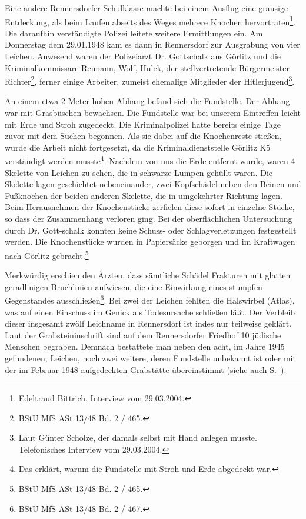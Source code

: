 Eine andere Rennersdorfer Schulklasse machte bei einem Ausflug eine grausige Entdeckung, als beim Laufen abseits des Weges mehrere Knochen hervortraten\footnote{Edeltraud Bittrich. Interview vom 29.03.2004.}. Die daraufhin verständigte Polizei leitete weitere Ermittlungen ein.
Am Donnerstag dem 29.01.1948 kam es dann in Rennersdorf zur Ausgrabung von vier Leichen. Anwesend waren der Polizeiarzt Dr. Gottschalk aus Görlitz und die Kriminalkommissare Reimann, Wolf, Hulek, der stellvertretende Bürgermeister Richter\footnote{BStU MfS ASt 13/48 Bd. 2 / 465.}, ferner einige Arbeiter, zumeist ehemalige Mitglieder der Hitlerjugend\footnote{Laut Günter Scholze, der damals selbst mit Hand anlegen musste. Telefonisches Interview vom 29.03.2004.}.
\begin{leftbar} 
An einem etwa 2 Meter hohen Abhang befand sich die Fundstelle. Der Abhang war mit Grasbüschen bewachsen. Die Fundstelle war bei unserem Eintreffen leicht mit Erde und Stroh zugedeckt. Die Kriminalpolizei hatte bereits einige Tage zuvor mit dem Suchen begonnen. Als sie dabei auf die Knochenreste stießen, wurde die Arbeit nicht fortgesetzt, da die Kriminaldienststelle Görlitz K5 verständigt werden musste\footnote{Das erklärt, warum die Fundstelle mit Stroh und Erde abgedeckt war.}.
\newline
Nachdem von uns die Erde entfernt wurde, waren 4 Skelette von Leichen zu sehen, die in schwarze Lumpen gehüllt waren. Die Skelette lagen geschichtet nebeneinander, zwei Kopfschädel neben den Beinen und Fußknochen der beiden anderen Skelette, die in umgekehrter Richtung lagen. Beim Herausnehmen der Knochenstücke zerfielen diese sofort in einzelne Stücke, so dass der Zusammenhang verloren ging. Bei der oberflächlichen Untersuchung durch Dr. Gott-schalk konnten keine Schuss- oder Schlagverletzungen festgestellt werden. Die Knochenstücke wurden in Papiersäcke geborgen und im Kraftwagen nach Görlitz gebracht.\footnote{BStU MfS ASt 13/48 Bd. 2 / 465.}
\end{leftbar}
Merkwürdig erschien den Ärzten, dass sämtliche Schädel Frakturen mit glatten geradlinigen Bruchlinien aufwiesen, die eine Einwirkung eines stumpfen Gegenstandes ausschließen\footnote{BStU MfS ASt 13/48 Bd. 2 / 467.}.
Bei zwei der Leichen fehlten die Halswirbel (Atlas), was auf einen Einschuss im Genick als Todesursache schließen läßt. 
\newline
Der Verbleib dieser insgesamt zwölf Leichname in Rennersdorf ist indes nur teilweise geklärt. Laut der Grabsteininschrift sind auf dem Rennersdorfer Friedhof 10 jüdische Menschen begraben. Demnach bestattete man neben den acht, im Jahre 1945 gefundenen, Leichen, noch zwei weitere, deren Fundstelle unbekannt ist oder mit der im Februar 1948 aufgedeckten Grabstätte übereinstimmt (siehe auch S.~\pageref{leichen}).

